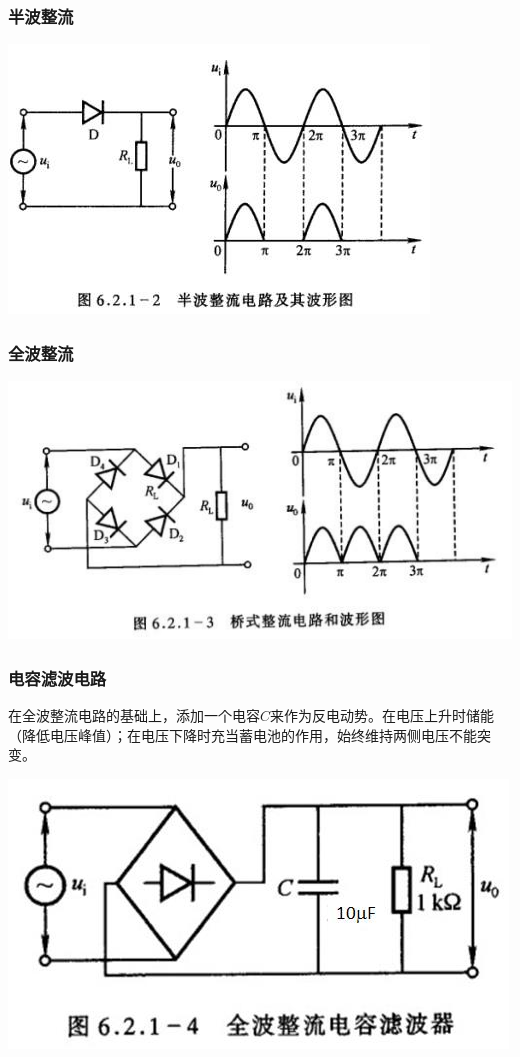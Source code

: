 \documentclass[a4paper]{ltxdoc}
\newenvironment{Figure}
{\par\medskip\noindent\minipage{\linewidth}}
{\endminipage\par\medskip}
\begin{document}
\begin{multicols}{2}
    \subsubsection{半波整流}
    \begin{Figure}
        \centering
        \includegraphics[width=0.7\linewidth]{img/1.png}
    \end{Figure}
    \subsubsection{全波整流}
    \begin{Figure}
        \centering
        \includegraphics[width=0.7\linewidth]{img/2.png}
    \end{Figure}

    \subsubsection{电容滤波电路}

    在全波整流电路的基础上，添加一个电容$C$来作为反电动势。在电压上升时储能（降低电压峰值）；在电压下降时充当蓄电池的作用，始终维持两侧电压不能突变。
    \begin{Figure}
        \centering
        \includegraphics[width=0.7\linewidth]{img/3.png}
    \end{Figure}


\end{multicols}
\end{document}
